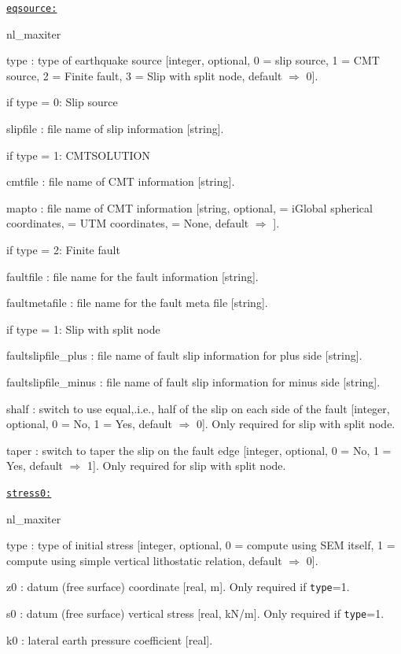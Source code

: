 \texttt{\underline{eqsource:}}
\begin{adescription}{nl\_maxiter}
  \item[type]: type of earthquake source [integer, optional, 0 = slip source, 1 = CMT source, 2 = Finite fault, 3 = Slip with split node, default $\Rightarrow$ 0].
  \item[if type = 0: Slip source]
  \item[  slipfile]: file name of slip information [string].
  \item[if type = 1: CMTSOLUTION]
  \item[  cmtfile]: file name of CMT information [string].
  \item[  mapto]: file name of CMT information [string, optional, \texttt{} = iGlobal spherical coordinates, \texttt{} = UTM coordinates, \texttt{} = None, default $\Rightarrow$ \texttt{}].
  \item[if type = 2: Finite fault]
  \item[  faultfile]: file name for the fault information [string].
  \item[  faultmetafile]: file name for the fault meta file [string].
  \item[if type = 1: Slip with split node]
  \item[  faultslipfile\_plus]: file name of fault slip information for plus side [string].
  \item[  faultslipfile\_minus]: file name of fault slip information for minus side [string].
  \item[  shalf]: switch to use equal,.i.e., half of the slip on each side of the fault [integer, optional, 0 = No, 1 = Yes, default $\Rightarrow$ 0]. Only required for slip with split node.
  \item[  taper]: switch to taper the slip on the fault edge [integer, optional, 0 = No, 1 = Yes, default $\Rightarrow$ 1]. Only required for slip with split node.
  \\
\end{adescription}

\texttt{\underline{stress0:}}
\begin{adescription}{nl\_maxiter}
  \item[type]: type of initial stress [integer, optional, 0 = compute using SEM itself, 1 = compute using simple vertical lithostatic relation, default $\Rightarrow$ 0].
  \item[z0]: datum (free surface) coordinate [real, m]. Only required if \texttt{type}=1.
  \item[s0]: datum (free surface) vertical stress [real, kN/m]. Only required if \texttt{type}=1.
  \item[k0]: lateral earth pressure coefficient [real].
  \\
\end{adescription}


